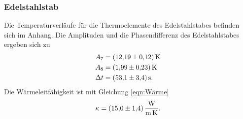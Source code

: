 \subsubsection{Edelstahlstab}




Die Temperaturverläufe für die Thermoelemente des Edelstahlstabes befinden sich im Anhang. %
Die Amplituden und die Phasendifferenz des Edelstahlstabes ergeben sich zu
\begin{align*}
    A_{7} &= \SI{12.19 \pm 0.12}{\kelvin} \\
    A_{8} &= \SI{1.99 \pm 0.23}{\kelvin} \\
    \Delta t &= \SI{53.1 \pm 3.4}{\second}.
\end{align*}
Die Wärmeleitfähigkeit ist mit Gleichung \eqref{eqn:Wärme}
\begin{equation*}
    \kappa = \SI{15.0 \pm 1.4}{\watt\per\meter\per\kelvin}.
\end{equation*}
